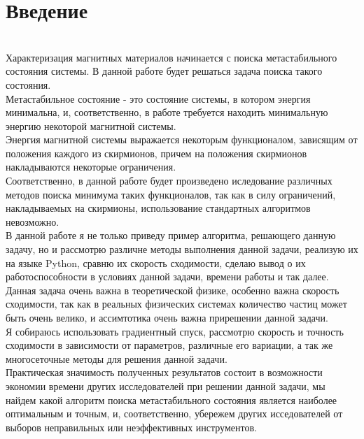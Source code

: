 \documentclass[ 12pt,x11names]{article}
\begin{document}
    \section{Введение}\\
         Характеризация магнитных материалов начинается с  поиска метастабильного состояния системы.
    В данной работе будет решаться задача поиска такого состояния.\\
        Метастабильное состояние - это состояние системы, в котором энергия минимальна, и, соответственно, в работе требуется находить минимальную энергию некоторой магнитной системы.\\
    Энергия магнитной системы выражается некоторым функционалом, зависящим от положения каждого из скирмионов, причем на положения скирмионов накладываются некоторые ограничения. \\Соответственно, в данной работе будет произведено иследование различных методов поиска минимума таких функционалов, так как в силу ограничений, накладываемых на скирмионы, использование стандартных алгоритмов невозможно.\\
    В данной работе я не только приведу пример алгоритма, решающего данную задачу, но и   рассмотрю различне методы выполнения данной задачи, реализую их на языке Python, сравню их скорость сходимости, сделаю вывод о их работоспособности в условиях данной задачи, времени работы и так далее.\\
    Данная задача очень важна в теоретической физике, особенно важна скорость сходимости, так как в реальных физических системах количество частиц может быть очень велико, и ассимтотика очень важна прирешении данной задачи.\\
    Я собираюсь использовать градиентный спуск, рассмотрю скорость и точность сходимости в зависимости от параметров, различные его вариации, а так же многосеточные методы для решения данной задачи.\\
     Практическая значимость полученных результатов состоит в возможности экономии времени других исследователей при решении данной задачи, мы найдем какой алгоритм поиска метастабильного состояния является наиболее оптимальным и точным, и, соответственно, убережем других исседователей от выборов неправильных или неэффективных инструментов.\\

    \newpage
\end{document}
